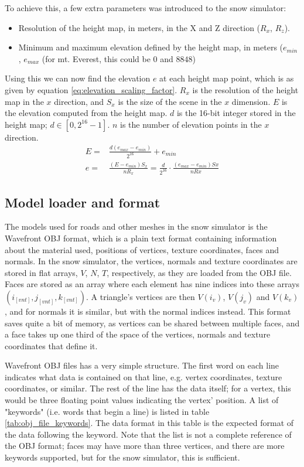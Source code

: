 To achieve this, a few extra parameters was introduced to the snow simulator:
\begin{itemize}
\item Resolution of the height map, in meters, in the X and Z direction ($R_x$, $R_z$).
\item Minimum and maximum elevation defined by the height map, in meters ($e_{min}$, $e_{max}$ (for mt. Everest, this could be $0$ and $8848$)
\end{itemize}
Using this we can now find the elevation $e$ at each height map point, which is as given by equation \ref{eq:elevation_scaling_factor}. $R_x$ is the resolution of the height map in the $x$ direction, and $S_x$ is the size of the scene in the $x$ dimension. $E$ is the elevation computed from the height map. $d$ is the 16-bit integer stored in the height map; $d\in [0,2^{16}-1]$. $n$ is the number of elevation points in the $x$ direction.
\begin{align}
E =& \frac{d(e_{max}-e_{min})}{2^{16}}+e_{min}\\
e =& \frac{(E-e_{min})S_x}{nR_x} = \frac{d}{2^{16}}\cdot \frac{(e_{max}-e_{min})Sx}{nRx} \label{eq:elevation_scaling_factor}
\end{align}

\subsection{Model loader and format}
The models used for roads and other meshes in the snow simulator is the Wavefront OBJ format, which is a plain text format containing information about the material used, positions of vertices, texture coordinates, faces and normals. In the snow simulator, the vertices, normals and texture coordinates are stored in flat arrays, $V$, $N$, $T$, respectively, as they are loaded from the OBJ file. Faces are stored as an array where each element has nine indices into these arrays $(i_{[vnt]}, j_{[vnt]}, k_{[vnt]})$.  A triangle's vertices are then $V(i_v)$, $V(j_v)$ and $V(k_v)$, and for normals it is similar, but with the normal indices instead. This format saves quite a bit of memory, as vertices can be shared between multiple faces, and a face takes up one third of the space of the vertices, normals and texture coordinates that define it.

Wavefront OBJ files has a very simple structure. The first word on each line indicates what data is contained on that line, e.g. vertex coordinates, texture coordinates, or similar. The rest of the line has the data itself; for a vertex, this would be three floating point values indicating the vertex' position. A list of "keywords" (i.e. words that begin a line) is listed in table \ref{tab:obj_file_keywords}. The data format in this table is the expected format of the data following the keyword. Note that the list is not a complete reference of the OBJ format; faces may have more than three vertices, and there are more keywords supported, but for the snow simulator, this is sufficient.

